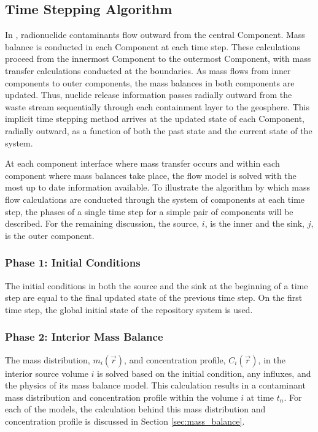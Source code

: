 \subsection{Time Stepping Algorithm}\label{sec:time stepping}

In \Cyder, radionuclide contaminants flow outward from the central 
Component. Mass balance is conducted in each Component at each time step. These 
calculations proceed from the innermost Component to the outermost Component, 
with mass transfer calculations conducted at the boundaries. As mass flows from 
inner components to outer components, the mass balances in both components are 
updated.  Thus, nuclide release information passes radially outward from the 
waste stream sequentially through each containment layer to the geosphere.  This 
implicit time stepping method arrives at the updated state of each Component, 
radially outward, as a function of both the past state and the current state of 
the system.  

At each component interface where mass transfer occurs and within each component 
where mass balances take place, the flow model is solved with the most up to 
date information available.  To illustrate the algorithm by which mass flow 
calculations are conducted through the system of components at each time step, 
the phases of a single time step for a simple pair of components will be 
described. For the remaining discussion, the source, $i$, is the inner and the 
sink, $j$, is the outer component. 

\subsubsection{Phase 1: Initial Conditions}

The initial conditions in both the source and the sink at the beginning of a 
time step are equal to the final updated state of the previous time step. On the 
first time step, the global initial state of the repository system is used. 

\subsubsection{Phase 2: Interior Mass Balance}

The mass distribution, $m_i(\vec{r})$, and concentration profile, $C_i(\vec{r})$, in the interior source volume 
$i$ is solved based on the initial condition, any influxes, and the physics of 
its mass balance model.  This calculation results in a contaminant mass 
distribution and concentration profile within the volume $i$ at time $t_n$.  
For each of the models, the calculation behind this mass distribution and 
concentration profile is discussed in Section \ref{sec:mass_balance}.

